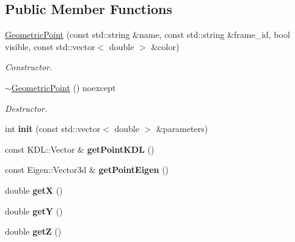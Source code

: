 \subsection*{Public Member Functions}
\begin{DoxyCompactItemize}
\item 
\hypertarget{classhiqp_1_1GeometricPoint_a51eb076c864a76806a904aad361c6a4b}{\hyperlink{classhiqp_1_1GeometricPoint_a51eb076c864a76806a904aad361c6a4b}{Geometric\-Point} (const std\-::string \&name, const std\-::string \&frame\-\_\-id, bool visible, const std\-::vector$<$ double $>$ \&color)}\label{classhiqp_1_1GeometricPoint_a51eb076c864a76806a904aad361c6a4b}

\begin{DoxyCompactList}\small\item\em Constructor. \end{DoxyCompactList}\item 
\hypertarget{classhiqp_1_1GeometricPoint_a32506f371236bb1bf188c0c07e2ca19b}{\hyperlink{classhiqp_1_1GeometricPoint_a32506f371236bb1bf188c0c07e2ca19b}{$\sim$\-Geometric\-Point} () noexcept}\label{classhiqp_1_1GeometricPoint_a32506f371236bb1bf188c0c07e2ca19b}

\begin{DoxyCompactList}\small\item\em Destructor. \end{DoxyCompactList}\item 
\hypertarget{classhiqp_1_1GeometricPoint_a2474e2e885e2930be30ba2a926a33afb}{int {\bfseries init} (const std\-::vector$<$ double $>$ \&parameters)}\label{classhiqp_1_1GeometricPoint_a2474e2e885e2930be30ba2a926a33afb}

\item 
\hypertarget{classhiqp_1_1GeometricPoint_aa826a1d534e2f2b2a9e1c2bd0723de8b}{const K\-D\-L\-::\-Vector \& {\bfseries get\-Point\-K\-D\-L} ()}\label{classhiqp_1_1GeometricPoint_aa826a1d534e2f2b2a9e1c2bd0723de8b}

\item 
\hypertarget{classhiqp_1_1GeometricPoint_ab8330fe9e6edc6bf160d8f85899133ef}{const Eigen\-::\-Vector3d \& {\bfseries get\-Point\-Eigen} ()}\label{classhiqp_1_1GeometricPoint_ab8330fe9e6edc6bf160d8f85899133ef}

\item 
\hypertarget{classhiqp_1_1GeometricPoint_a879d12c1861a9698b87bdfdccb3be852}{double {\bfseries get\-X} ()}\label{classhiqp_1_1GeometricPoint_a879d12c1861a9698b87bdfdccb3be852}

\item 
\hypertarget{classhiqp_1_1GeometricPoint_afa745d3c5a4485e6f2591653add4c5ab}{double {\bfseries get\-Y} ()}\label{classhiqp_1_1GeometricPoint_afa745d3c5a4485e6f2591653add4c5ab}

\item 
\hypertarget{classhiqp_1_1GeometricPoint_a5db01bdc8eae270f9fa90cbb48a66214}{double {\bfseries get\-Z} ()}\label{classhiqp_1_1GeometricPoint_a5db01bdc8eae270f9fa90cbb48a66214}

\end{DoxyCompactItemize}
